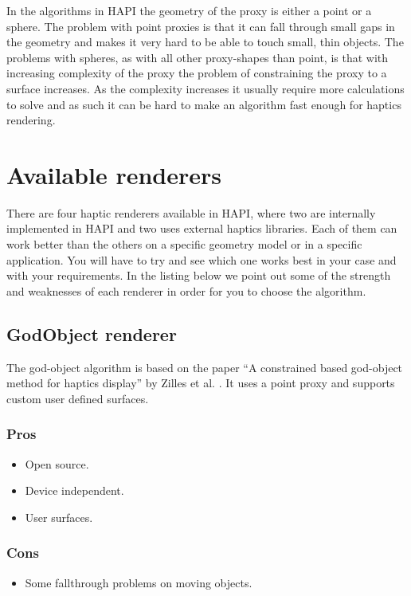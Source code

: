 In the algorithms in HAPI the geometry of the proxy is either a point
or a sphere. The problem with point proxies is that it can fall
through small gaps in the geometry and makes it very hard to be able
to touch small, thin objects. The problems with spheres, as with
all other proxy-shapes than point, is that with
increasing complexity of the proxy the problem of constraining the
proxy to a surface increases. As the complexity increases it usually
require more calculations to solve and as such it can be hard to
make an algorithm fast enough for haptics rendering.

\section{Available renderers}
There are four haptic renderers available in HAPI, where two are internally
implemented in HAPI and two uses external haptics libraries. Each of them can work better than the others on a specific geometry model or in a specific application. You will have to try and see which one works best in your case and with your requirements. In the listing below we point out some of the strength and weaknesses of each renderer in order for you to choose the algorithm. 

\subsection{GodObject renderer}
The god-object algorithm is based on the paper ``A constrained based god-object method for haptics display'' by Zilles et al. \cite{zilles95constraintbased}. It uses a point proxy and supports custom user defined surfaces.


\begin{minipage}[t]{3in}
\subsubsection{Pros} 
\begin{itemize} 
\item Open source. 
\item Device independent. 
\item User surfaces. 
\end{itemize} 
\end{minipage}
\begin{minipage}[t]{3in}
\subsubsection{Cons} 
\begin{itemize} 
\item Some fallthrough problems on moving objects.
\end{itemize}
\end{minipage}

